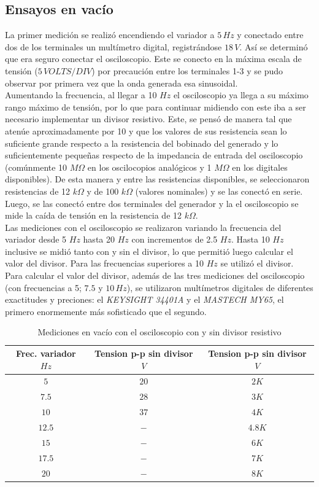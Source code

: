 \documentclass[a4paper,11pt,twoside]{IT-CNEA}
\begin{document}
\subsection{Ensayos en vacío}
La primer medición se realizó encendiendo el variador a $5\,Hz$ y conectado entre dos de los terminales un multímetro digital, registrándose $18\,V$. Así se determinó que era seguro conectar el osciloscopio. Este se conecto en la máxima escala de tensión ($5\,VOLTS/DIV$) por precaución entre los terminales 1-3 y se pudo observar por primera vez que la onda generada esa sinusoidal.
\\Aumentando la frecuencia, al llegar a 10 $Hz$ el osciloscopio ya llega a su máximo rango máximo de tensión, por lo que para continuar midiendo con este iba a ser necesario implementar un divisor resistivo. Este, se pensó de manera tal que atenúe aproximadamente por 10 y que los valores de sus resistencia sean lo suficiente grande respecto a la resistencia del bobinado del generado y lo suficientemente pequeñas respecto de la impedancia de entrada del osciloscopio (comúnmente 10 $M\varOmega$ en los oscilocopios analógicos y 1 $M\varOmega$ en los digitales disponibles). De esta manera y entre las resistencias disponibles, se seleccionaron resistencias de 12 $k\varOmega$ y de 100 $k\varOmega$ (valores nominales) y se las conectó en serie. Luego, se las conectó entre dos terminales del generador y la el osciloscopio se mide la caída de tensión en la resistencia de 12 $k\varOmega$.
\\Las mediciones con el osciloscopio se realizaron variando la frecuencia del variador desde 5 $Hz$ hasta 20 $Hz$ con incrementos de 2.5 $Hz$. Hasta 10 $Hz$ inclusive se midió tanto con y sin el divisor, lo que permitió luego calcular el valor del divisor. Para las frecuencias superiores a 10 $Hz$ se utilizó el divisor.
\\Para calcular el valor del divisor, además de las tres mediciones del osciloscopio (con frecuencias a 5; $7.5$ y $10\,Hz$), se utilizaron multímetros digitales de diferentes exactitudes y preciones: el \textit{KEYSIGHT 34401A} y el \textit{MASTECH MY65}, el primero enormemente más sofisticado que el segundo. 
\begin{table}[h!]
\centering
\caption{Mediciones en vacío con el osciloscopio con y sin divisor resistivo}
\label{tabla:vacioOsc}
\begin{tabular}{|c|c|c|}
\hline
Frec. variador $Hz$ & Tension p-p sin divisor $V$& Tension p-p sin divisor $V$\\ \hline
$5$&$20$&$2K$ \\ \hline
$7.5$&$28$&$3K$ \\ \hline
$10$&$37$&$4K$ \\ \hline
$12.5$&$-$&$4.8K$ \\ \hline
$15$&$-$&$6K$ \\ \hline
$17.5$&$-$&$7K$ \\ \hline
$20$&$-$&$8K$ \\ \hline

\end{tabular}
\end{table}
\end{document}
